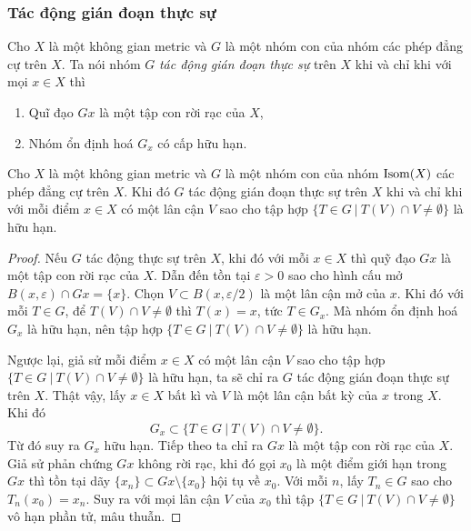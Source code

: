 \subsubsection{Tác động gián đoạn thực sự}
\begin{defn}
    Cho $X$ là một không gian metric và $G$ là một nhóm con của nhóm các phép đẳng cự trên $X$. Ta nói nhóm $G$ \textit{tác động gián đoạn thực sự} trên $X$ khi và chỉ khi với mọi $x\in X$ thì
    \begin{enumerate}
        \item Quĩ đạo $Gx$ là một tập con rời rạc của $X$,
        \item Nhóm ổn định hoá $G_x$ có cấp hữu hạn.
    \end{enumerate}
\end{defn}
\begin{prop}\label{prop 3.2.13}
    Cho $X$ là một không gian metric và $G$ là một nhóm con của nhóm $\operatorname{Isom}(X)$ các phép đẳng cự trên $X$. Khi đó $G$ tác động gián đoạn thực sự trên $X$ khi và chỉ khi với mỗi điểm $x\in X$ có một lân cận $V$ sao cho tập hợp $\{T \in G~|~T(V) \cap V \neq \emptyset\}$ là hữu hạn.
\end{prop}
\begin{proof}
    Nếu $G$ tác động thực sự trên $X$, khi đó với mỗi $x\in X$ thì quỹ đạo $Gx$ là một tập con rời rạc của $X$. Dẫn đến tồn tại $\varepsilon >0$ sao cho hình cấu mở $B(x,\varepsilon) \cap Gx = \{x\}$. Chọn $V \subset B(x,\varepsilon/2)$ là một lân cận mở của $x$. Khi đó với mỗi $T\in G$, để $T(V) \cap V \neq \emptyset$ thì $T(x) = x$, tức $T \in G_x$. Mà nhóm ổn định hoá $G_x$ là hữu hạn, nên tập hợp $\{T \in G~|~T(V) \cap V \neq \emptyset\}$ là hữu hạn.

    Ngược lại, giả sử mỗi điểm $x\in X$ có một lân cận $V$ sao cho tập hợp $\{T \in G~|~T(V) \cap V \neq \emptyset\}$ là hữu hạn, ta sẽ chỉ ra $G$ tác động gián đoạn thực sự trên $X$. Thật vậy, lấy $x \in X$ bất kì và $V$ là một lân cận bất kỳ của $x$ trong $X$. Khi đó 
    \[G_x \subset \{T \in G~|~T(V) \cap V \neq \emptyset\}.\]
    Từ đó suy ra $G_x$ hữu hạn. Tiếp theo ta chỉ ra $Gx$ là một tập con rời rạc của $X$. Giả sử phản chứng $Gx$ không rời rạc, khi đó gọi $x_0 $ là một điểm giới hạn trong $Gx$ thì tồn tại dãy $\{x_n\} \subset Gx\setminus\{x_0\}$ hội tụ về $x_0$. Với mỗi $n$, lấy $T_n \in G$ sao cho $T_n(x_0) = x_n$. Suy ra với mọi lân cận $V$ của $x_0$ thì tập $\{T \in G~|~T(V) \cap V \neq \emptyset\}$ vô hạn phần tử, mâu thuẫn.
\end{proof}
